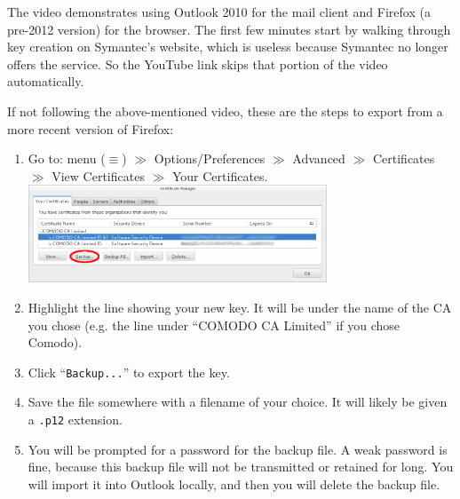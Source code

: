 \documentclass[pdftex,12pt,titlepage=false]{scrartcl}
\begin{document}
The video demonstrates using Outlook 2010 for the mail client and
Firefox (a pre-2012 version) for the browser.  The first few minutes
start by walking through key creation on Symantec's website, which is
useless because Symantec no longer offers the service.  So the YouTube
link skips that portion of the video automatically.

If not following the above-mentioned video, these are the steps to
export from a more recent version of Firefox:

\begin{enumerate}
  \item Go to: menu ($\equiv$) $\gg$ Options/Preferences $\gg$ Advanced
  $\gg$ Certificates $\gg$ View Certificates $\gg$ Your Certificates.\\[1em]%
  \includegraphics[width=0.7\textwidth]{images/firefox_cert_settings.png}
\item Highlight the line showing your new key.  It will be under the
  name of the CA you chose (e.g. the line under ``COMODO CA Limited''
  if you chose Comodo).
\item %
  Click ``\texttt{Backup...}'' to export the key.
\item Save the file somewhere with a filename of your choice.  It will
  likely be given a \verb|.p12| extension.
\item\label{makebupw} You will be prompted for a password for the
  backup file.  A weak password is fine, because this backup file will
  not be transmitted or retained for long.  You will import it into
  Outlook locally, and then you will delete the backup file.
\end{enumerate}
\end{document}
